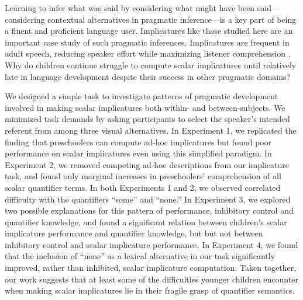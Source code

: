\documentclass[man]{apa2}
\begin{document}

Learning to infer what was said by considering what might have been said---considering contextual alternatives in pragmatic inference---is a key part of being a fluent and proficient language user. Implicatures like those studied here are an important case study of such pragmatic inferences. Implicatures are frequent in adult speech, reducing speaker effort while maximizing listener comprehension \cite{grice1975,horn1984}. Why do children continue struggle to compute scalar implicatures until relatively late in language development despite their success in other pragmatic domains?

We designed a simple task to investigate patterns of pragmatic development involved in making scalar implicatures both within- and between-subjects. We minimized task demands by asking participants to select the speaker's intended referent from among three visual alternatives. In Experiment 1, we replicated the finding that preschoolers can compute ad-hoc implicatures \cite{stiller2015} but found poor performance on scalar implicatures even using this simplified paradigm. In Experiment 2, we removed competing ad-hoc descriptions from our implicature task, and found only marginal increases in preschoolers' comprehension of all scalar quantifier terms. In both Experiments 1 and 2, we observed correlated difficulty with the quantifiers ``some'' and ``none.'' In Experiment 3, we explored two possible explanations for this pattern of performance, inhibitory control and quantifier knowledge, and found a significant relation between children's scalar implicature performance and quantifier knowledge, but but not between inhibitory control and scalar implicature performance. In Experiment 4, we found that the inclusion of ``none'' as a lexical alternative in our task significantly improved, rather than inhibited, scalar implicature computation. Taken together, our work suggests that at least some of the difficulties younger children encounter when making scalar implicatures lie in their fragile grasp of quantifier semantics.
\end{document}
